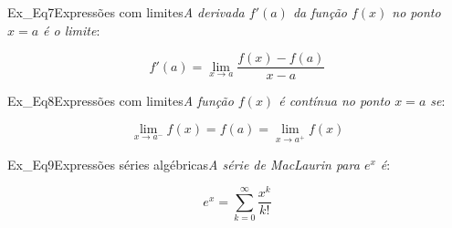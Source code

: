 \begin{texercise}{Ex_Eq7}{Expressões com limites}\textit{A derivada $f'(a)$ da função $f(x)$ no ponto $x=a$ é o limite}:\par\smallskip%
\begin{tcboutputlisting}
    \begin{center}
        \begin{equation*}
            f'(a) = \lim_{x \to a} \frac{f(x) - f(a)}{x - a}
        \end{equation*}
    \end{center}
\end{tcboutputlisting}
\tcbuselistingtext%
\end{texercise}

\begin{texercise}{Ex_Eq8}{Expressões com limites}\textit{A função $f(x)$ é contínua no ponto $x=a$ se}:\par\smallskip%
\begin{tcboutputlisting}
    \begin{center}
        \begin{equation*}
            \lim_{x \to a^{-}} f(x) = f(a) = \lim_{x \to a^{+}} f(x)
        \end{equation*}
    \end{center}
\end{tcboutputlisting}
\tcbuselistingtext%
\end{texercise}

\begin{texercise}{Ex_Eq9}{Expressões séries algébricas}\textit{A série de MacLaurin para $e^{x}$ é}:\par\smallskip%
\begin{tcboutputlisting}
    \begin{center}
        \begin{equation*}
            e^{x} = \sum_{k=0}^{\infty} \frac{x^{k}}{k!}
        \end{equation*}
    \end{center}
\end{tcboutputlisting}
\tcbuselistingtext%
\end{texercise}

